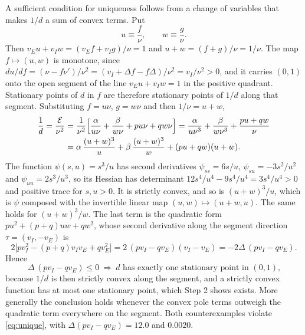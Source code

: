 \documentclass[11pt]{article}
\newcommand{\energy}{\mathcal E}
\begin{document}
A sufficient condition for uniqueness follows from a change of variables that makes $1/d$ a sum of convex terms. Put
\[
 u\equiv\frac f\nu,\qquad w\equiv\frac g\nu .
\]
Then $v_Eu+v_Iw=(v_Ef+v_Ig)/\nu=1$ and $u+w=(f+g)/\nu=1/\nu$. The map $f\mapsto(u,w)$ is monotone, since $du/df=(\nu-f\nu')/\nu^2=(v_I+\Delta f-f\Delta)/\nu^2=v_I/\nu^2>0$, and it carries $(0,1)$ onto the open segment of the line $v_Eu+v_Iw=1$ in the positive quadrant. Stationary points of $d$ in $f$ are therefore stationary points of $1/d$ along that segment. Substituting $f=u\nu$, $g=w\nu$ and then $1/\nu=u+w$,
\begin{align*}
 \frac1d=\frac{\energy}{\nu^2}
 &=\frac1{\nu^2}\Bigl[\frac{\alpha}{u\nu}+\frac{\beta}{w\nu}+pu\nu+qw\nu\Bigr]
  =\frac{\alpha}{u\nu^3}+\frac{\beta}{w\nu^3}+\frac{pu+qw}{\nu}\\
 &=\alpha\,\frac{(u+w)^3}{u}+\beta\,\frac{(u+w)^3}{w}+(pu+qw)(u+w).
\end{align*}
The function $\psi(s,u)=s^3/u$ has second derivatives $\psi_{ss}=6s/u$, $\psi_{su}=-3s^2/u^2$ and $\psi_{uu}=2s^3/u^3$, so its Hessian has determinant $12s^4/u^4-9s^4/u^4=3s^4/u^4>0$ and positive trace for $s,u>0$. It is strictly convex, and so is $(u+w)^3/u$, which is $\psi$ composed with the invertible linear map $(u,w)\mapsto(u+w,u)$. The same holds for $(u+w)^3/w$. The last term is the quadratic form $pu^2+(p+q)uw+qw^2$, whose second derivative along the segment direction $\tau=(v_I,-v_E)$ is
\[
 2\bigl[pv_I^2-(p+q)v_Iv_E+qv_E^2\bigr]=2\,(pv_I-qv_E)(v_I-v_E)=-2\Delta\,(pv_I-qv_E).
\]
Hence
\begin{equation}
 \boxed{\;\Delta\,(pv_I-qv_E)\le0\ \Longrightarrow\ \text{$d$ has exactly one stationary point in $(0,1)$,}\;}
 \label{eq:unique}
\end{equation}
because $1/d$ is then strictly convex along the segment, and a strictly convex function has at most one stationary point, which Step 2 shows exists. More generally the conclusion holds whenever the convex pole terms outweigh the quadratic term everywhere on the segment. Both counterexamples violate \eqref{eq:unique}, with $\Delta(pv_I-qv_E)=12.0$ and $0.0020$.
\end{document}
